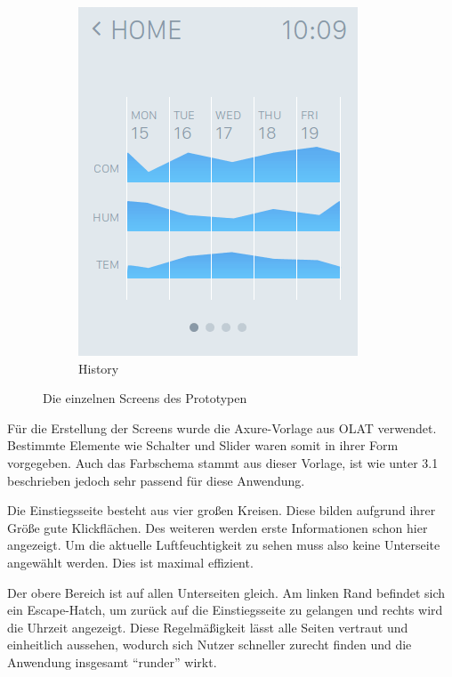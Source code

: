\documentclass[a4paper,10pt]{article}
\begin{document}
\begin{figure}[!h]
\begin{subfigure}[!h]{0.3\textwidth}
        \includegraphics[width=\textwidth]{images/history.png}
        \caption{History}
    \end{subfigure}
    
    \caption{Die einzelnen Screens des Prototypen}
\end{figure}

Für die Erstellung der Screens wurde die Axure-Vorlage aus OLAT verwendet. Bestimmte Elemente wie Schalter und Slider waren somit in ihrer Form vorgegeben. Auch das Farbschema stammt aus dieser Vorlage, ist wie unter 3.1 beschrieben jedoch sehr passend für diese Anwendung.

Die Einstiegsseite besteht aus vier großen Kreisen. Diese bilden aufgrund ihrer Größe gute Klickflächen. Des weiteren werden erste Informationen schon hier angezeigt. Um die aktuelle Luftfeuchtigkeit zu sehen muss also keine Unterseite angewählt werden. Dies ist maximal effizient.

Der obere Bereich ist auf allen Unterseiten gleich. Am linken Rand befindet sich ein Escape-Hatch, um zurück auf die Einstiegsseite zu gelangen und rechts wird die Uhrzeit angezeigt. Diese Regelmäßigkeit lässt alle Seiten vertraut und einheitlich aussehen, wodurch sich Nutzer schneller zurecht finden und die Anwendung insgesamt ``runder'' wirkt. 
\end{document}
